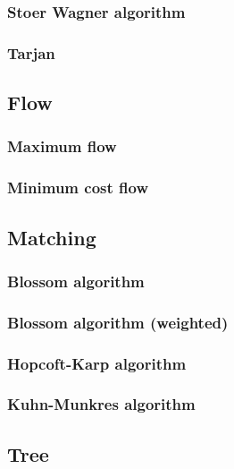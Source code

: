 \documentclass[titlepage,a4paper,10pt]{article}
\begin{document}
\begin{multicols}{2}
\begin{spacing}{0.8}
{				\subsubsection{Stoer Wagner algorithm}
					
				\subsubsection{Tarjan}
					
			\subsection{Flow}
				\subsubsection{Maximum flow}
					
				\subsubsection{Minimum cost flow}
					
			\subsection{Matching}
				
				\subsubsection{Blossom algorithm}
					
				\subsubsection{Blossom algorithm (weighted)}
					
				\subsubsection{Hopcoft-Karp algorithm}
					
				\subsubsection{Kuhn-Munkres algorithm}
					
			\subsection{Tree}
}
\end{spacing}
\end{multicols}
\end{document}
